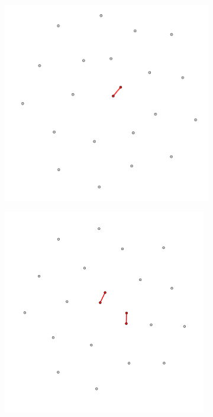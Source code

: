\begin{figure}
    \centering
    \begin{subfigure}{0.3\textwidth}
        \centering
        \includegraphics[width=\textwidth]{figures/temporal/0.png}
        \caption{}
        \label{fig:temporal net A}
    \end{subfigure}
    \hfill
    \begin{subfigure}{0.3\textwidth}
        \centering
        \includegraphics[width=\textwidth]{figures/temporal/1.png}

\end{subfigure}
\end{figure}
